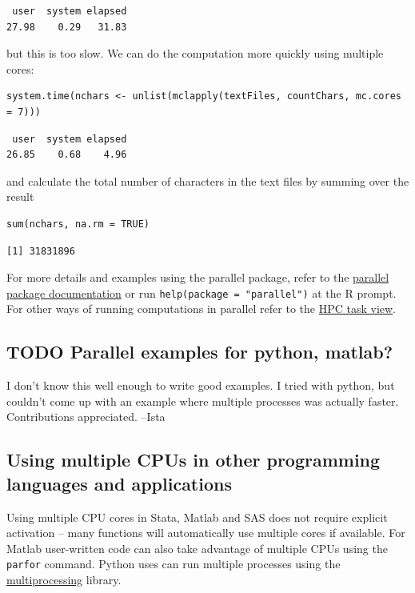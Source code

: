 \documentclass[11pt]{article}
\begin{document}
\begin{verbatim}
 user  system elapsed 
27.98    0.29   31.83
\end{verbatim}
but this is too slow. We can do the computation more quickly using multiple cores:
\begin{verbatim}
system.time(nchars <- unlist(mclapply(textFiles, countChars, mc.cores = 7)))
\end{verbatim}

\begin{verbatim}
 user  system elapsed 
26.85    0.68    4.96
\end{verbatim}
and calculate the total number of characters in the text files by summing over the result
\begin{verbatim}
sum(nchars, na.rm = TRUE)
\end{verbatim}

\begin{verbatim}
[1] 31831896
\end{verbatim}

For more details and examples using the parallel package, refer to the \href{https://stat.ethz.ch/R-manual/R-devel/library/parallel/doc/parallel.pdf}{parallel package documentation} or run \texttt{help(package = "parallel")} at the R prompt. For other ways of running computations in parallel refer to the \href{http://cran.r-project.org/web/views/HighPerformanceComputing.html}{HPC task view}.

\subsection{{\bfseries\sffamily TODO} Parallel examples for python, matlab?}
\label{sec-6-4}
I don't know this well enough to write good examples. I tried with python, but couldn't come up with an example where multiple processes was actually faster. Contributions appreciated. --Ista

\subsection{Using multiple CPUs in other programming languages and applications}
\label{sec-6-5}
Using multiple CPU cores in Stata, Matlab and SAS does not require explicit activation -- many functions will automatically use multiple cores if available. For Matlab user-written code can also take advantage of multiple CPUs using the \texttt{parfor} command. Python uses can run multiple processes using the \href{https://docs.python.org/2/library/multiprocessing.html}{multiprocessing} library.
\end{document}
